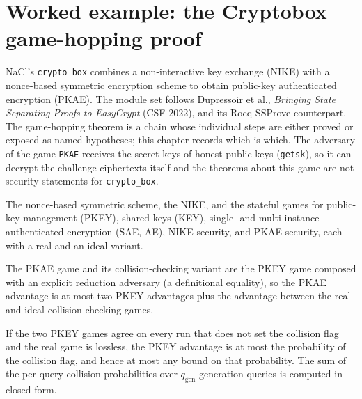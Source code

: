 \chapter{Worked example: the Cryptobox game-hopping proof}

NaCl's \texttt{crypto\_box} combines a non-interactive key exchange (NIKE) with a
nonce-based symmetric encryption scheme to obtain public-key authenticated
encryption (PKAE). The module set follows Dupressoir et al., \emph{Bringing State
Separating Proofs to EasyCrypt} (CSF 2022), and its Rocq SSProve counterpart. The
game-hopping theorem is a chain whose individual steps are either proved or
exposed as named hypotheses; this chapter records which is which. The adversary
of the game \texttt{PKAE} receives the secret keys of honest public keys
(\texttt{getsk}), so it can decrypt the challenge ciphertexts itself and the
theorems about this game are not security statements for \texttt{crypto\_box}.

\begin{definition}
  \label{def:cryptobox-games}
  \leanok
  The nonce-based symmetric scheme, the NIKE, and the stateful games for public-key
  management (PKEY), shared keys (KEY), single- and multi-instance authenticated
  encryption (SAE, AE), NIKE security, and PKAE security, each with a real and an
  ideal variant.
\end{definition}

\begin{theorem}
  \label{thm:cryptobox-pkey}
  \leanok
  The PKAE game and its collision-checking variant are the PKEY game composed with
  an explicit reduction adversary (a definitional equality), so the PKAE
  advantage is at most two PKEY advantages plus the advantage between the real
  and ideal collision-checking games.
\end{theorem}

\begin{theorem}
  \label{thm:cryptobox-collision}
  \leanok
  If the two PKEY games agree on every run that does not set the collision flag
  and the real game is lossless, the PKEY advantage is at most the probability of
  the collision flag, and hence at most any bound on that probability. The sum of the per-query collision probabilities over
  $q_{\mathrm{gen}}$ generation queries is computed in closed form.
\end{theorem}


